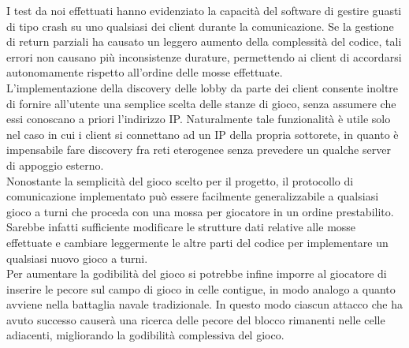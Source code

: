 I test da noi effettuati hanno evidenziato la capacità del software di gestire 
guasti di tipo crash su uno qualsiasi dei client durante la comunicazione. Se 
la gestione di return parziali ha causato un leggero aumento della complessità 
del codice, tali errori non causano più inconsistenze durature, permettendo ai 
client di accordarsi autonomamente rispetto all'ordine delle mosse effettuate.
\\
L'implementazione della discovery delle lobby da parte dei client consente 
inoltre di fornire all'utente una semplice scelta delle stanze di gioco, senza 
assumere che essi conoscano a priori l'indirizzo IP. Naturalmente 
tale funzionalità è utile solo nel caso in cui i client si connettano ad un IP 
della propria sottorete, in quanto è impensabile fare discovery fra reti 
eterogenee senza prevedere un qualche server di appoggio esterno.
\\
Nonostante la semplicità del gioco scelto per il progetto, il protocollo di 
comunicazione implementato può essere facilmente generalizzabile a qualsiasi 
gioco a turni che proceda con una mossa per giocatore in un ordine prestabilito.
Sarebbe infatti sufficiente modificare le strutture dati relative alle mosse 
effettuate e cambiare leggermente le altre parti del codice per implementare un 
qualsiasi nuovo gioco a turni.
\\
Per aumentare la godibilità del gioco si potrebbe infine imporre al giocatore 
di inserire le pecore sul campo di gioco in celle contigue, in modo analogo a 
quanto avviene nella battaglia navale tradizionale. In questo modo ciascun 
attacco che ha avuto successo causerà una ricerca delle pecore del blocco 
rimanenti nelle celle adiacenti, migliorando la godibilità complessiva del 
gioco.